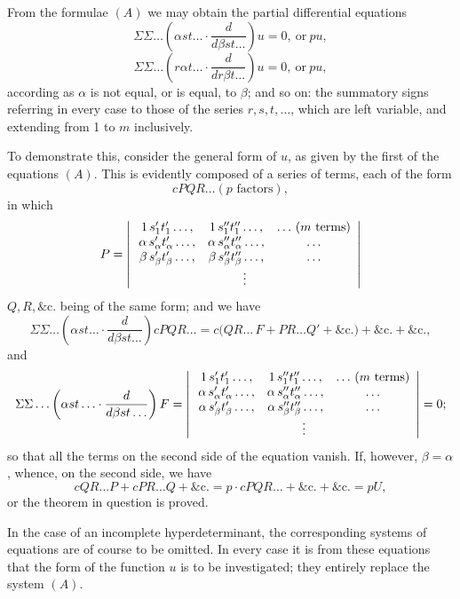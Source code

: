 \documentclass[11pt]{article}
\begin{document}
From the formulae $(A)$ we may obtain the partial differential equations
\[
\Sigma\Sigma\ldots\left(\alpha st\ldots\cdot \frac{d}{d\beta st\ldots}\right)u = 0,\ \text{or}\ pu, \tag{D}
\]
\[
\Sigma\Sigma\ldots\left(r\alpha t\ldots\cdot \frac{d}{dr\beta t\ldots}\right)u = 0,\ \text{or}\ pu,
\]
according as $\alpha$ is not equal, or is equal, to $\beta$;
and so on: the summatory signs referring in every case to those of the series $r, s, t,\ldots$,
which are left variable, and extending from 1 to $m$ inclusively.

To demonstrate this, consider the general form of $u$, as given by the first of the
equations $(A)$. This is evidently composed of a series of terms, each of the form
\[
c PQR \ldots (p\text{ factors}),
\]
in which
\[
P = \left|\,
\begin{array}{ccc}
1\,s_1' t_1' \ldots, & 1\,s_1'' t_1'' \ldots, & \ldots\,(m\text{ terms})\\
\alpha\,s_\alpha' t_\alpha' \ldots, & \alpha\,s_\alpha'' t_\alpha'' \ldots, & \ldots\\
\beta\,s_\beta' t_\beta' \ldots, & \beta\,s_\beta'' t_\beta'' \ldots, & \ldots\\
\multicolumn{3}{c}{\vdots}
\end{array}
\right|
\]
$Q, R, \&\text{c.}$ being of the same form; and we have
\[
\Sigma\Sigma\ldots\left(\alpha st\ldots\cdot\frac{d}{d\beta st\ldots}\right)cPQR\ldots = c\bigl(QR\ldots\,F + PR\ldots Q' + \&\text{c.}\bigr) + \&\text{c.} + \&\text{c.},
\]
and
\[
\Sigma\Sigma\ldots\left(\alpha st\ldots\cdot\frac{d}{d\beta st\ldots}\right)F = \left|\,
\begin{array}{ccc}
1\,s_1' t_1' \ldots, & 1\,s_1'' t_1'' \ldots, & \ldots\,(m\text{ terms})\\
\alpha\,s_\alpha' t_\alpha' \ldots, & \alpha\,s_\alpha'' t_\alpha'' \ldots, & \ldots\\
\alpha\,s_\beta' t_\beta' \ldots, & \alpha\,s_\beta'' t_\beta'' \ldots, & \ldots\\
\multicolumn{3}{c}{\vdots}
\end{array}
\right| = 0;
\]
so that all the terms on the second side of the equation vanish. If, however, $\beta = \alpha$,
whence, on the second side, we have
\[
cQR\ldots P + cPR\ldots Q + \&\text{c.} = p \cdot cPQR\ldots + \&\text{c.} + \&\text{c.} = pU,
\]
or the theorem in question is proved.

In the case of an incomplete hyperdeterminant, the corresponding systems of
equations are of course to be omitted. In every case it is from these equations that
the form of the function $u$ is to be investigated; they entirely replace the system $(A)$.
\end{document}
